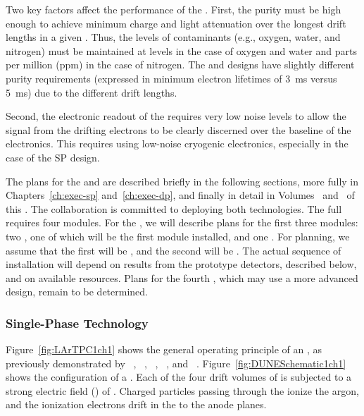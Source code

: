 Two key factors affect the performance of the  .  First, the  purity must be high enough to achieve minimum charge and light attenuation over the longest drift lengths in a given .  Thus, the levels of contaminants (e.g., oxygen, water, and nitrogen) must be maintained at  levels in the case of oxygen and water and parts per million (ppm) in the case of nitrogen.  The  and  designs have slightly different purity requirements (expressed in minimum electron lifetimes of \SI{3}{ms} versus \SI{5}{ms}) due to the different drift lengths.

Second, the electronic readout of the  requires very low noise levels to allow the signal from the drifting electrons to be clearly discerned over the baseline of the electronics.  This requires using low-noise cryogenic electronics, especially in the case of the SP design.

The plans for the  and   are described briefly in the following sections, more fully in Chapters~\ref{ch:exec-sp} and~\ref{ch:exec-dp}, and finally in detail in Volumes~\volnumbersp{} and~\volnumberdp{} of this . 
The  collaboration is committed to deploying both technologies. The full   requires four modules. For the , we will describe plans for the first three modules: two , one of which will be the first module installed, and one . For planning, we assume that the first  will be , and the second will be . The actual sequence of  installation will depend on results from the prototype detectors, described below, and on available resources. Plans for the fourth , which may use a more advanced design, remain to be determined. 

\subsubsection{Single-Phase Technology}
\label{sec:fdsp-exec-splar}

Figure~\ref{fig:LArTPC1ch1} shows the general operating principle of an  , as previously demonstrated by  ~\cite{Icarus-T600}, ~\cite{microboone}, ~\cite{Anderson:2012vc}, ~\cite{Cavanna:2014iqa}, and ~\cite{Abi:2017aow}. Figure~\ref{fig:DUNESchematic1ch1} shows the configuration of a  . Each of the four drift volumes of  is subjected to a strong electric field (\efield{}) of \spmaxfield. Charged particles passing through the  ionize the argon, and the ionization electrons drift in the \efield to the anode planes. 


